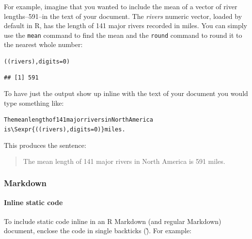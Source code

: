 {For example, imagine that you wanted to include the mean of a vector of river lengths--591--in the text of your document. The {\emph{rivers}} numeric vector, loaded by default in R, has the length of 141 major rivers recorded in miles. You can simply use the {\tt{mean}} command to find the mean and the {\tt{round}} command to round it to the nearest whole number:

\begin{knitrout}
\color{fgcolor}\begin{kframe}
\begin{alltt}
((rivers), digits = 0)
\end{alltt}
\begin{verbatim}
## [1] 591
\end{verbatim}
\end{kframe}
\end{knitrout}


\noindent To have just the output show up inline with the text of your document you would type something like:

\begin{knitrout}
\color{fgcolor}\begin{kframe}
\begin{alltt}
The mean length of 141 major rivers in North America
is \textbackslash{}Sexpr\{((rivers), digits = 0)\} miles. 
\end{alltt}
\end{kframe}
\end{knitrout}


\noindent This produces the sentence:

\begin{quote}
    The mean length of 141 major rivers in North America is 591 miles. 
\end{quote}

\subsubsection{Markdown}

\paragraph{Inline static code}

To include static code inline in an R Markdown (and regular Markdown) document, enclose the code in single backticks (\` \`). For example:

}
